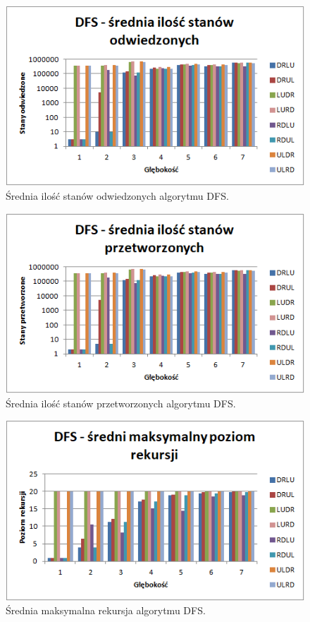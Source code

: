 \documentclass{classrep}
\begin{document}
\begin{figure}[H]
	\centering
		\includegraphics[width=1\textwidth]{Wykresy/7.png}
	\caption{Średnia ilość stanów odwiedzonych algorytmu DFS.}
\end{figure}
\begin{figure}[H]
	\centering
		\includegraphics[width=1\textwidth]{Wykresy/8.png}
	\caption{Średnia ilość stanów przetworzonych algorytmu DFS.}
\end{figure}
\begin{figure}[H]
	\centering
		\includegraphics[width=1\textwidth]{Wykresy/9.png}
	\caption{Średnia maksymalna rekursja algorytmu DFS.}
\end{figure}
\end{document}
